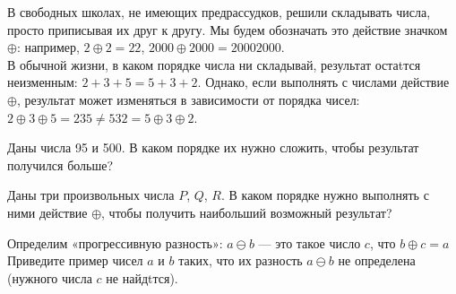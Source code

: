 ﻿
\noindent В свободных школах, не имеющих предрассудков, решили складывать числа, просто приписывая их друг к другу. Мы будем обозначать это действие значком $\oplus$: например, $2 \oplus 2 = 22$, $2000 \oplus 2000 = 20002000$. \smallskip\\
В обычной жизни, в каком порядке числа ни складывай, результат остаtтся неизменным: $2+3+5 = 5+3+2$. Однако, если выполнять с числами действие $\oplus$, результат может изменяться в зависимости от порядка чисел: $2 \oplus 3 \oplus 5 = 235 \ne 532 = 5 \oplus 3 \oplus 2$.

\begin{enumerate}
\itA Даны числа 95 и 500. В каком порядке их нужно сложить, чтобы результат получился больше?

\itB Даны три произвольных числа $P$, $Q$, $R$. В каком порядке нужно выполнять с ними действие $\oplus$, чтобы получить наибольший возможный результат?

\itC Определим «прогрессивную разность»: $a \ominus b$ — это такое число $c$, что $b \oplus c = a$ Приведите пример чисел $a$ и $b$ таких, что их разность $a \ominus b$ не определена (нужного числа $c$ не найдtтся).
\end{enumerate}